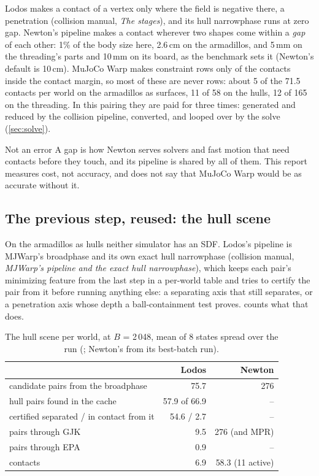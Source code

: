 Lodos makes a contact of a vertex only where the field is negative there, a penetration (collision manual, \emph{The stages}), and its hull narrowphase runs at zero gap. Newton's pipeline makes a contact wherever two shapes come within a \emph{gap} of each other: 1\% of the body size here, 2.6\,cm on the armadillos, and 5\,mm on the threading's parts and 10\,mm on its board, as the benchmark sets it (Newton's default is 10\,cm). MuJoCo Warp makes constraint rows only of the contacts inside the contact margin, so most of these are never rows: about 5 of the 71.5 contacts per world on the armadillos as surfaces, 11 of 58 on the hulls, 12 of 165 on the threading. In this pairing they are paid for three times: generated and reduced by the collision pipeline, converted, and looped over by the solve (\cref{sec:solve}).

\begin{notebox}{Not an error}
A gap is how Newton serves solvers and fast motion that need contacts before they touch, and its pipeline is shared by all of them. This report measures cost, not accuracy, and does not say that MuJoCo Warp would be as accurate without it.
\end{notebox}

\subsection{The previous step, reused: the hull scene}\label{sec:hulls}

On the armadillos as hulls neither simulator has an SDF. Lodos's pipeline is MJWarp's broadphase and its own exact hull narrowphase (collision manual, \emph{MJWarp's pipeline and the exact hull narrowphase}), which keeps each pair's minimizing feature from the last step in a per-world table and tries to certify the pair from it before running anything else: a separating axis that still separates, or a penetration axis whose depth a ball-containment test proves.  counts what that does.

\begin{table}[t]
\centering
\caption{The hull scene per world, at $B$ = 2\,048, mean of 8 states spread over the run (; Newton's from its best-batch run).}
\label{tab:hulls}
\small
\begin{tabularx}{\linewidth}{@{}Yrr@{}}
\toprule
& Lodos & Newton \\
\midrule
candidate pairs from the broadphase & 75.7 & 276 \\
hull pairs found in the cache & 57.9 of 66.9 & -- \\
\quad certified separated / in contact from it & 54.6 / 2.7 & -- \\
pairs through GJK & 9.5 & 276 (and MPR) \\
pairs through EPA & 0.9 & -- \\
contacts & 6.9 & 58.3 (11 active) \\
\bottomrule
\end{tabularx}
\end{table}

